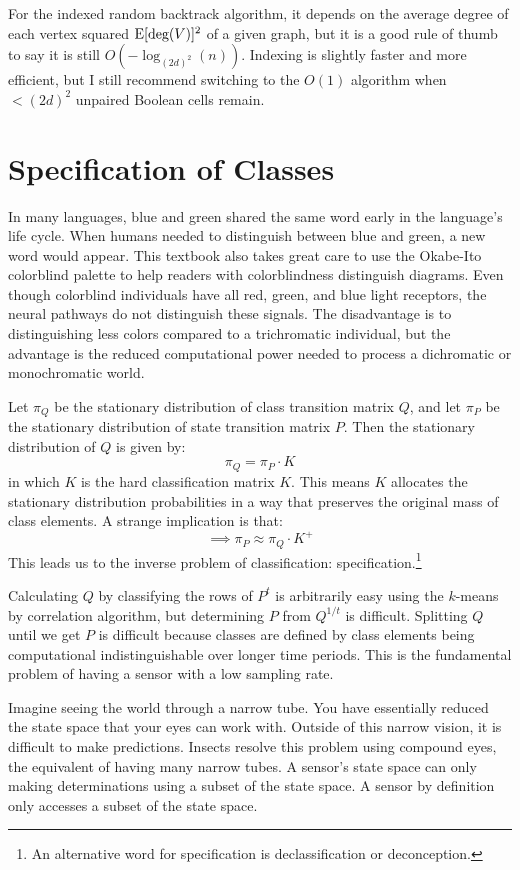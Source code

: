 \documentclass[10pt, a5paper, twoside, openright]{memoir}
\begin{document}
For the indexed random backtrack algorithm, it depends on the average degree of each vertex squared $\mathrm{E}[\textnormal{deg}(V)]^2$ of a given graph, but it is a good rule of thumb to say it is still $O(-\log_{(2d)^2}(n))$. Indexing is slightly faster and more efficient, but I still recommend switching to the $O(1)$ algorithm when $<(2d)^2$ unpaired Boolean cells remain.


\chapter{Specification of Classes}
In many languages, blue and green shared the same word early in the language's life cycle. When humans needed to distinguish between blue and green, a new word would appear. This textbook also takes great care to use the Okabe-Ito colorblind palette to help readers with colorblindness distinguish diagrams. Even though colorblind individuals have all red, green, and blue light receptors, the neural pathways do not distinguish these signals. The disadvantage is to distinguishing less colors compared to a trichromatic individual, but the advantage is the reduced computational power needed to process a dichromatic or monochromatic world.

Let $\pi_Q$ be the stationary distribution of class transition matrix $Q$, and let $\pi_P$ be the stationary distribution of state transition matrix $P$. Then the stationary distribution of $Q$ is given by:
$$\pi_Q = \pi_P \cdot K$$
in which $K$ is the hard classification matrix $K$. This means $K$ allocates the stationary distribution probabilities in a way that preserves the original mass of class elements. A strange implication is that:
$$\implies \pi_P \approx \pi_Q \cdot K^+$$
This leads us to the inverse problem of classification: specification.\footnote{An alternative word for specification is declassification or deconception.}

Calculating $Q$ by classifying the rows of $P^t$ is arbitrarily easy using the $k$-means by correlation algorithm, but determining $P$ from $Q^{1/t}$ is difficult. Splitting $Q$ until we get $P$ is difficult because classes are defined by class elements being computational indistinguishable over longer time periods. This is the fundamental problem of having a sensor with a low sampling rate.

Imagine seeing the world through a narrow tube. You have essentially reduced the state space that your eyes can work with. Outside of this narrow vision, it is difficult to make predictions. Insects resolve this problem using compound eyes, the equivalent of having many narrow tubes. A sensor's state space can only making determinations using a subset of the state space. A sensor by definition only accesses a subset of the state space.
\end{document}
